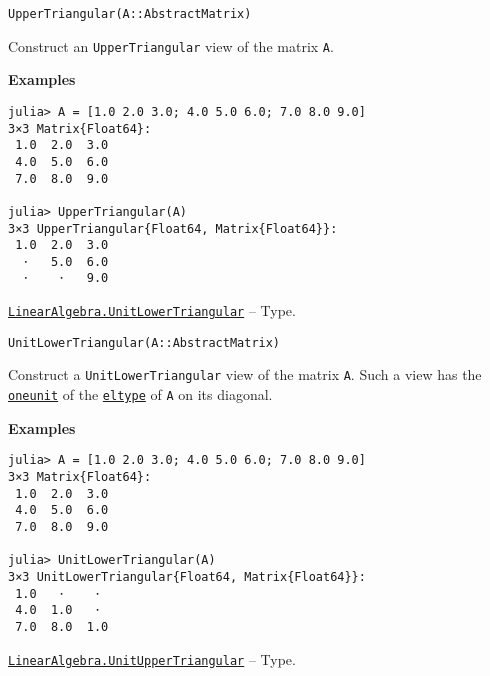 \begin{adjustwidth}{2em}{0pt}


\begin{verbatim}
UpperTriangular(A::AbstractMatrix)
\end{verbatim}

Construct an \texttt{UpperTriangular} view of the matrix \texttt{A}.

\textbf{Examples}


\begin{verbatim}
julia> A = [1.0 2.0 3.0; 4.0 5.0 6.0; 7.0 8.0 9.0]
3×3 Matrix{Float64}:
 1.0  2.0  3.0
 4.0  5.0  6.0
 7.0  8.0  9.0

julia> UpperTriangular(A)
3×3 UpperTriangular{Float64, Matrix{Float64}}:
 1.0  2.0  3.0
  ⋅   5.0  6.0
  ⋅    ⋅   9.0
\end{verbatim}



\end{adjustwidth}
\hypertarget{2163321084999097240}{}
\hyperlink{2163321084999097240}{\texttt{LinearAlgebra.UnitLowerTriangular}}  -- {Type.}

\begin{adjustwidth}{2em}{0pt}


\begin{verbatim}
UnitLowerTriangular(A::AbstractMatrix)
\end{verbatim}

Construct a \texttt{UnitLowerTriangular} view of the matrix \texttt{A}. Such a view has the \hyperlink{2310843180104103470}{\texttt{oneunit}} of the \hyperlink{6396209842929672718}{\texttt{eltype}} of \texttt{A} on its diagonal.

\textbf{Examples}


\begin{verbatim}
julia> A = [1.0 2.0 3.0; 4.0 5.0 6.0; 7.0 8.0 9.0]
3×3 Matrix{Float64}:
 1.0  2.0  3.0
 4.0  5.0  6.0
 7.0  8.0  9.0

julia> UnitLowerTriangular(A)
3×3 UnitLowerTriangular{Float64, Matrix{Float64}}:
 1.0   ⋅    ⋅
 4.0  1.0   ⋅
 7.0  8.0  1.0
\end{verbatim}



\end{adjustwidth}
\hypertarget{17221720404477798393}{}
\hyperlink{17221720404477798393}{\texttt{LinearAlgebra.UnitUpperTriangular}}  -- {Type.}

